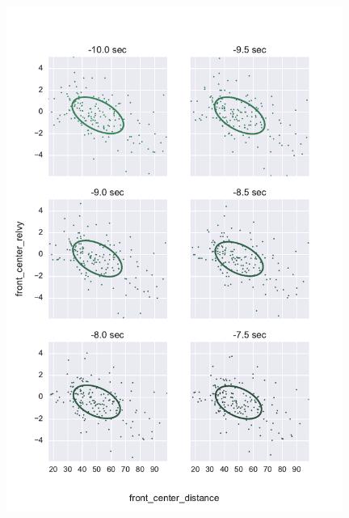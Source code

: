 \begin{figure}[p]
  \centering
    \includegraphics[width=11cm,keepaspectratio]{fig/scatter_ellipse_front_center_distance_front_center_relvy0.pdf}
\end{figure}
